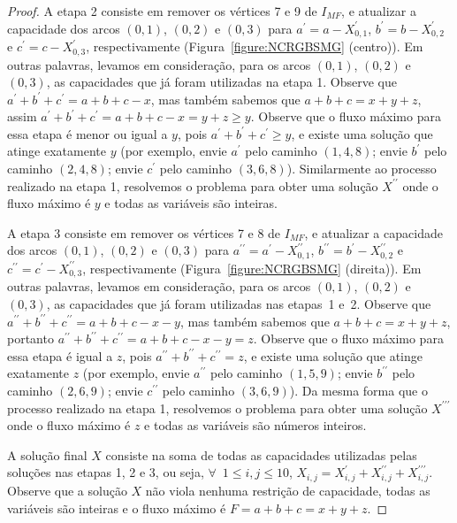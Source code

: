 \begin{proof}
A etapa 2 consiste em remover os vértices 7 e 9 de $I_{MF}$, e atualizar a capacidade dos arcos $(0,1)$, $(0,2)$ e $(0,3)$ para $a ^{\prime}=a-X^{\prime}_{0,1}$, $b^{\prime}=b-X^{\prime}_{0,2}$ e $c^{\prime} =c-X^{\prime}_{0,3}$, respectivamente (Figura~\ref{figure:NCRGBSMG} (centro)). Em outras palavras, levamos em consideração, para os arcos $(0,1)$, $(0,2)$ e $(0,3)$, as capacidades que já foram utilizadas na etapa 1. Observe que $a^{\prime}+b^{\prime}+c^{\prime} = a+b+c-x$, mas também sabemos que $a+b+c = x+y+z$, assim $a^{\prime}+b^{\prime}+c^{\prime} = a+b+c-x = y+z \geq y$. Observe que o fluxo máximo para essa etapa é menor ou igual a $y$, pois $a^{\prime}+b^{\prime}+c^{\prime} \ge y$, e existe uma solução que atinge exatamente $y$ (por exemplo, envie $a^{\prime}$ pelo caminho $(1,4,8)$; envie $b^{\prime}$ pelo caminho $(2,4,8) $; envie $c^{\prime}$ pelo caminho $(3,6,8)$). Similarmente ao processo realizado na etapa 1, resolvemos o problema para obter uma solução $X^{\prime\prime}$ onde o fluxo máximo é $y$ e todas as variáveis são inteiras.

A etapa 3 consiste em remover os vértices 7 e 8 de $I_{MF}$, e atualizar a capacidade dos arcos $(0,1)$, $(0,2)$ e $(0,3)$ para $a ^{\prime\prime}=a^{\prime}-X^{\prime\prime}_{0,1}$, $b^{\prime\prime}=b^{\prime}-X^ {\prime\prime}_{0,2}$ e $c^{\prime\prime}=c^{\prime}-X^{\prime\prime}_{0,3}$, respectivamente (Figura~\ref{figure:NCRGBSMG} (direita)). Em outras palavras, levamos em consideração, para os arcos $(0,1)$, $(0,2)$ e $(0,3)$, as capacidades que já foram utilizadas nas etapas~1 e~2. Observe que $a^{\prime\prime}+b^{\prime\prime}+c^{\prime\prime} = a+b+c-x-y$, mas também sabemos que $a+b+c = x +y+z$, portanto $a^{\prime\prime}+b^{\prime\prime}+c^{\prime\prime} = a+b+c-x-y = z$. Observe que o fluxo máximo para essa etapa é igual a $z$, pois $a^{\prime\prime}+b^{\prime\prime}+c^{\prime\prime} = z$, e existe uma solução que atinge exatamente $z$ (por exemplo, envie $a^{\prime\prime}$ pelo caminho $(1,5,9)$; envie $b^{\prime\prime}$ pelo caminho $ (2,6,9)$; envie $c^{\prime\prime}$ pelo caminho $(3,6,9)$). Da mesma forma que o processo realizado na etapa 1, resolvemos o problema para obter uma solução $X^{\prime\prime\prime}$ onde o fluxo máximo é $z$ e todas as variáveis são números inteiros.



A solução final $X$ consiste na soma de todas as capacidades utilizadas pelas soluções nas etapas 1, 2 e 3, ou seja, $\forall$~$1\leq i,j\leq 10$, $X_{i, j} = X^{\prime}_{i,j} + X^{\prime\prime}_{i,j} + X^{\prime\prime\prime}_{i,j}$. Observe que a solução $X$ não viola nenhuma restrição de capacidade, todas as variáveis são inteiras e o fluxo máximo é $F=a+b+c=x+y+z$.

\end{proof}

